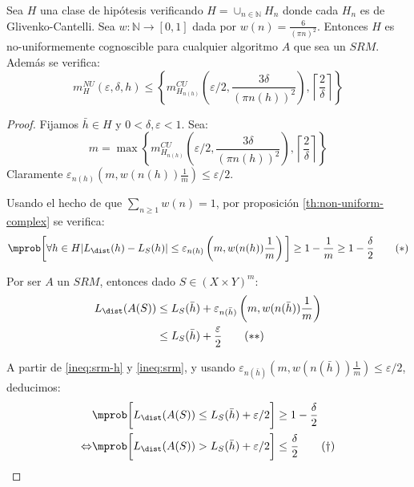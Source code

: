 \begin{fact}
Sea $H$ una clase de hipótesis verificando $H = \cup_{n\in \mathbb{N}} H_n$ donde cada 
$H_n$ es de Glivenko-Cantelli. Sea $w : \mathbb{N} \rightarrow [0,1]$ dada por $w(n) = \frac{6}{(\pi n)^2}$. 
Entonces $H$ es no-uniformemente cognoscible para cualquier algoritmo $A$ que sea un $SRM$. Además se verifica:
\[
  m_{H}^{NU} (\varepsilon, \delta, h) \le \left\{m_{H_{n(h)}}^{CU} \left(\varepsilon/2, \frac{3 \delta}{(\pi n(h))^2} \right), 
  \left\lceil\frac{2}{\delta}\right\rceil \right\}
\]
\end{fact}
  \begin{proof}
   Fijamos $\bar{h}\in H$ y $0 < \delta, \varepsilon < 1$. Sea:
   \[
     m = \max\left\{m_{H_{n(h)}}^{CU} \left(\varepsilon/2, \frac{3 \delta}{(\pi n(h))^2} \right), \left\lceil\frac{2}{\delta}\right\rceil \right\}
   \]
   Claramente $\varepsilon_{n(h)}\left(m, w(n(h)) \frac{1}{m}\right) \le \varepsilon/2$.

   Usando el hecho de que $\sum_{n\ge 1} w(n) = 1$, por proposición \ref{th:non-uniform-complex} se verifica:    
   \begin{equation}
     \mprob \bigg[\forall h\in H |L_{\dist}(h) - L_S(h)| \le \varepsilon_{n(h)} \left(m, w(n(h)) \frac{1}{m}\right)\bigg] 
     \ge 1-\frac{1}{m} \ge 1 - \frac{\delta}{2}
   \label{ineq:srm-h}\tag{\textrm{$\ast$}}
   \end{equation}
   
   Por ser $A$ un $SRM$, entonces dado $S\in (X\times Y)^m$:
   \begin{align}
     L_{\dist}(A(S)) &\le L_S(\bar{h}) + \varepsilon_{n(\bar{h})} \left(m, w(n(\bar{h}))\frac{1}{m}\right) \nonumber\\
                     &\le L_S(\bar{h}) + \frac{\varepsilon}{2}
     \label{ineq:srm}\tag{\textrm{$\ast$$\ast$}}
   \end{align}
   
   A partir de \eqref{ineq:srm-h} y \eqref{ineq:srm}, y usando $\varepsilon_{n(\bar{h})}\left(m, w(n(\bar{h})) \frac{1}{m}\right) \le \varepsilon/2$, deducimos:
   \begin{align}
                     &\mprob \bigg[L_{\dist}(A(S)) \le L_{S}(\bar{h}) + \varepsilon/2\bigg] \ge 1-\frac{\delta}{2} \nonumber\\
     \Leftrightarrow &\mprob \bigg[L_{\dist}(A(S)) > L_{S}(\bar{h}) + \varepsilon/2\bigg] \le \frac{\delta}{2}
     \label{ineq:LDbound}\tag{\textrm{$\dagger$}}
   \end{align}
   

\end{proof}
